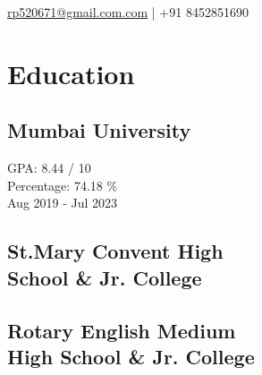 \documentclass[]{rohan-resume-openfont}
\begin{document}
%
%
\lastupdated

%
%
{%
\href{mailto:rp520671@gmail.com}{rp520671@gmail.com.com} | +91 8452851690  
}

%
%

\begin{minipage}[t]{0.33\textwidth} 


\section{Education} 

\subsection{Mumbai University}
GPA: 8.44 / 10 \\
Percentage: 74.18 \% \\
 Aug 2019 - Jul 2023
\sectionsep 
\vspace{6pt}
\subsection{St.Mary Convent High\\
School \& Jr. College}
\sectionsep
\vspace{6pt}
\subsection{Rotary English Medium\\
High School \& Jr. College}


\end{minipage}
\end{document}
